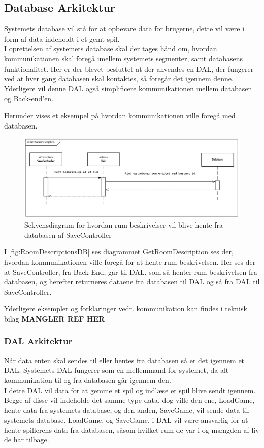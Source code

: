 \subsection{Database Arkitektur}
Systemets database vil stå for at opbevare data for brugerne, dette vil være i form af data indeholdt i et gemt spil.\\
I oprettelsen af systemets database skal der tages hånd om, hvordan kommunikationen skal foregå imellem systemets segmenter, samt databasens funktionalitet. Her er der blevet besluttet at der anvendes en DAL, der fungerer ved at hver gang databasen skal kontaktes, så foregår det igennem denne. Yderligere vil denne DAL også simplificere kommunikationen mellem databasen og Back-end'en. 

\noindent Herunder vises et eksempel på hvordan kommunikationen ville foregå med databasen.

\begin{figure}[H]
\centering
\includegraphics[width = \textwidth]{02-Body/Images/RoomDescriptionsDB.PNG}
\caption{Sekvensdiagram for hvordan rum beskrivelser vil blive hente fra databasen af SaveController}
\label{fig:RoomDescriptionsDB}
\end{figure}

\noindent I \autoref{fig:RoomDescriptionsDB} ses diagrammet GetRoomDescription ses der, hvordan kommunikationen ville foregå for at hente rum beskrivelsen. Her ses der at SaveController, fra Back-End, går til DAL, som så henter rum beskrivelsen fra databasen, og herefter returneres dataene fra databasen til DAL og så fra DAL til SaveController.

Yderligere eksempler og forklaringer vedr. kommunikation kan findes i teknisk bilag \textbf{MANGLER REF HER}

\subsubsection{DAL Arkitektur}
Når data enten skal sendes til eller hentes fra databasen så er det igennem et DAL. Systemets DAL fungerer som en mellemmand for systemet, da alt kommunikation til og fra databasen går igennem den.\\
\noindent I dette DAL vil data for at gemme et spil og indlæse et spil blive sendt igennem. Begge af disse vil indeholde det samme type data, dog ville den ene, LoadGame, hente data fra systemets database, og den anden, SaveGame, vil sende data til systemets database. 
LoadGame, og SaveGame, i DAL vil være ansvarlig for at hente spillerens data fra databasen, såsom hvilket rum de var i og mængden af liv de har tilbage.